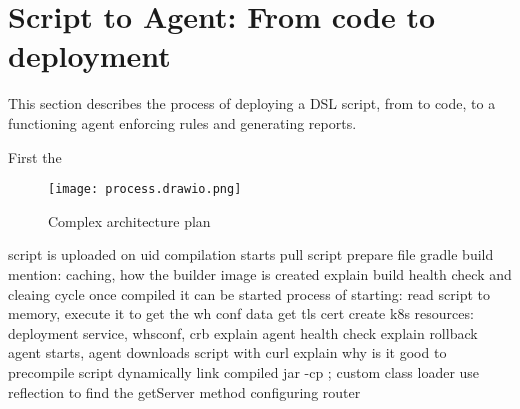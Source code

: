\section[Script to Agent]{Script to Agent: From code to deployment}

This section describes the process of deploying a DSL script, from to code, to a functioning agent enforcing rules and generating reports.

First the 

\begin{figure}[h]
    \centering
    \texttt{[image: process.drawio.png]}
    \caption{Complex architecture plan}
    \label{fig:comp_arch}
\end{figure}

script is uploaded on uid
compilation starts
    pull script
    prepare file
    gradle build
    mention: caching, how the builder image is created
    explain build health check and cleaing cycle
once compiled it can be started
process of starting:    
    read script to memory, execute it to get the wh conf data
    get tls cert
    create k8s resources: deployment service, whsconf, crb
    explain agent health check
    explain rollback
agent starts, agent downloads script with curl
    explain why is it good to precompile script
    dynamically link compiled jar -cp ; custom class loader
    use reflection to find the getServer method
    configuring router